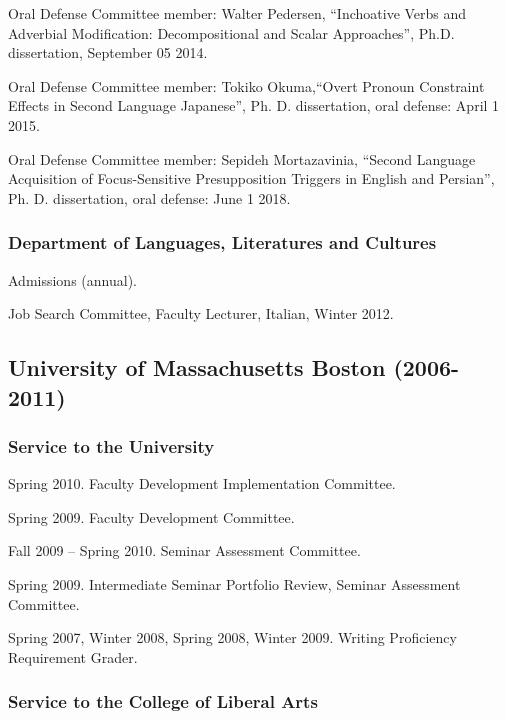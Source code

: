 \documentclass[11pt]{article}
\begin{document}
Oral Defense Committee member:  Walter Pedersen, ``Inchoative Verbs and Adverbial Modification: Decompositional and Scalar Approaches'', Ph.D. dissertation, September 05 2014.

Oral Defense Committee member:  Tokiko Okuma,``Overt Pronoun Constraint Effects in Second Language Japanese'', Ph. D. dissertation, oral defense: April 1 2015.

Oral Defense Committee member: Sepideh Mortazavinia, ``Second Language Acquisition of Focus-Sensitive Presupposition Triggers in English and Persian'',  Ph. D. dissertation, oral defense: June 1 2018.


\vspace{-10pt}

\subsubsection*{Department of Languages, Literatures and Cultures}

 Admissions (annual).

Job Search Committee, Faculty Lecturer, Italian, Winter 2012.


\subsection*{University of Massachusetts Boston (2006-2011)}

\subsubsection*{Service to the University}

Spring 2010. Faculty Development Implementation Committee.

Spring 2009. Faculty Development Committee.

Fall 2009 -- Spring 2010. Seminar Assessment Committee.

Spring 2009. Intermediate Seminar Portfolio Review, Seminar Assessment Committee.

Spring 2007, Winter 2008, Spring 2008, Winter 2009. Writing Proficiency Requirement Grader.


\subsubsection*{Service to the College of Liberal Arts}
\end{document}
